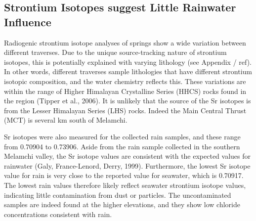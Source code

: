 \subsection{Strontium Isotopes suggest Little Rainwater Influence}

Radiogenic strontium isotope analyses of springs show a wide variation between different traverses. Due to the unique source-tracking nature of strontium isotopes, this is potentially explained with varying lithology (see Appendix / ref). In other words, different traverses sample lithologies that have different strontium isotopic composition, and the water chemistry reflects this. These variations are within the range of Higher Himalayan Crystalline Series (HHCS) rocks found in the region (Tipper et al., 2006). It is unlikely that the source of the Sr isotopes is from the Lesser Himalayan Series (LHS) rocks. Indeed the Main Central Thrust (MCT) is several km south of Melamchi.

\bsk

Sr isotopes were also measured for the collected rain samples, and these range from 0.70904 to 0.73906. Aside from the rain sample collected in the southern Melamchi valley, the Sr isotope values are consistent with the expected values for rainwater (Galy, France-Lenord, Derry, 1999). Furthermore, the lowest Sr isotope value for rain is very close to the reported value for seawater, which is 0.70917. The lowest rain values therefore likely reflect seawater strontium isotope values, indicating little contamination from dust or particles. The uncontaminated samples are indeed found at the higher elevations, and they show low chloride concentrations consistent with rain.\\


